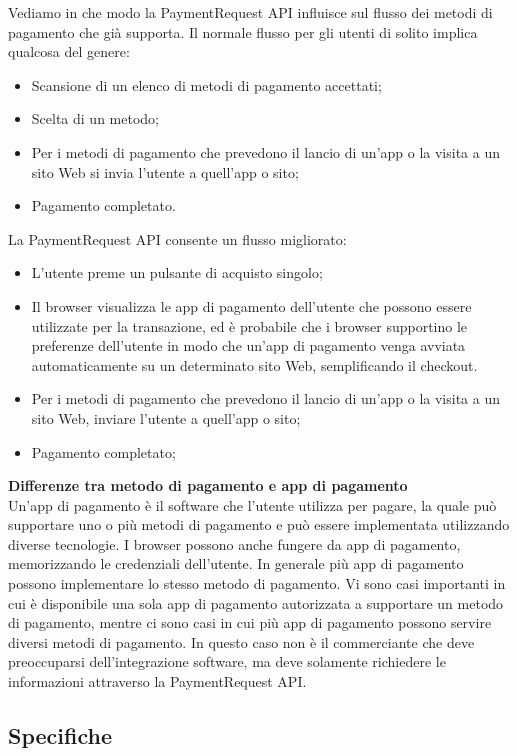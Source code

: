 \documentclass[11pt ,a4paper , twoside , openright ]{article}
\begin{document}
Vediamo in che modo la PaymentRequest API influisce sul flusso dei metodi di pagamento che già supporta. Il normale flusso per gli utenti di solito implica qualcosa del genere:
\begin{itemize}
	\item Scansione di un elenco di metodi di pagamento accettati;
	\item Scelta di un metodo;
	\item Per i metodi di pagamento che prevedono il lancio di un'app o la visita a un sito Web si invia l'utente a quell'app o sito;
	\item Pagamento completato.
\end{itemize}
La PaymentRequest API consente un flusso migliorato:
\begin{itemize}
	\item L'utente preme un pulsante di acquisto singolo;
	\item Il browser visualizza le app di pagamento dell'utente che possono essere utilizzate per la transazione, ed è probabile che i browser supportino le preferenze dell'utente in modo che un'app di pagamento venga avviata automaticamente su un determinato sito Web, semplificando il checkout.
	\item Per i metodi di pagamento che prevedono il lancio di un'app o la visita a un sito Web, inviare l'utente a quell'app o sito; 
	\item Pagamento completato; 
\end{itemize}

\textbf{Differenze tra metodo di pagamento e app di pagamento}
\\
Un'app di pagamento è il software che l'utente utilizza per pagare, la quale può supportare uno o più metodi di pagamento e può essere implementata utilizzando diverse tecnologie. I browser possono anche fungere da app di pagamento, memorizzando le credenziali dell'utente. In generale più app di pagamento possono implementare lo stesso metodo di pagamento. 
Vi sono casi importanti in cui è disponibile una sola app di pagamento autorizzata a supportare un metodo di pagamento, mentre ci sono casi in cui più app di pagamento possono servire diversi metodi di pagamento. In questo caso non è il commerciante che deve preoccuparsi dell'integrazione software, ma deve solamente richiedere le informazioni attraverso la PaymentRequest API.

\subsection{Specifiche}
\end{document}
